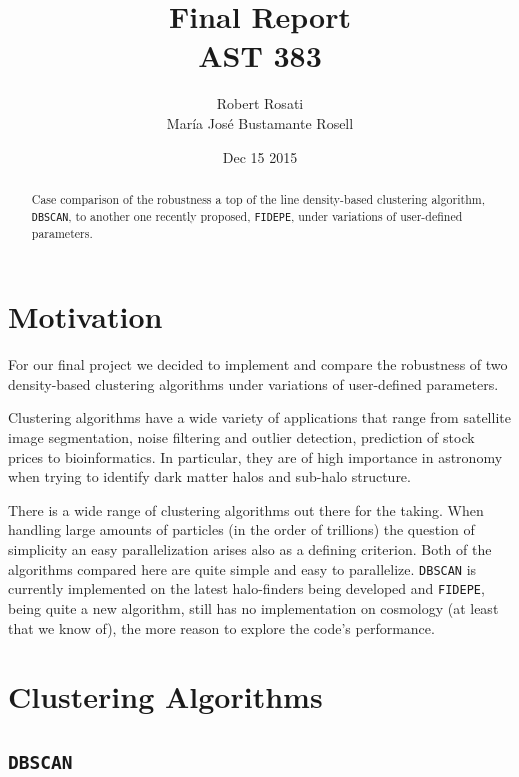 \documentclass[12pt]{article}
\begin{document}
\singlespacing
\title{Final Report\\
AST 383}
\date{Dec 15 2015}
\author{Robert Rosati \\ Mar\'{i}a Jos\'{e} Bustamante Rosell}
\maketitle

\begin{abstract}
\par Case comparison of the robustness a top of the line density-based clustering algorithm, \texttt{DBSCAN},  to another one recently proposed, \texttt{FIDEPE}, under variations of user-defined parameters.
\end{abstract}

\doublespacing
\section{Motivation}

\par For our final project we decided to implement and compare the robustness of two density-based clustering algorithms under variations of user-defined parameters. 
\par Clustering algorithms have a wide variety of applications that range from satellite image segmentation, noise filtering and outlier detection, prediction of stock prices to bioinformatics. In particular, they are of high importance in astronomy when trying to identify dark matter halos and sub-halo structure.
\par There is a wide range of clustering algorithms out there for the taking. When handling large amounts of particles (in the order of trillions) the question of simplicity an easy parallelization arises also as a defining criterion. Both of the algorithms compared here are quite simple and easy to parallelize. \texttt{DBSCAN} is currently implemented on the latest halo-finders being developed \cite{BDCATS} and \texttt{FIDEPE}, being quite a new algorithm, still has no implementation on cosmology (at least that we know of), the more reason to explore the code's performance.

\section{Clustering Algorithms}



\subsection{\texttt{DBSCAN}}
\end{document}
